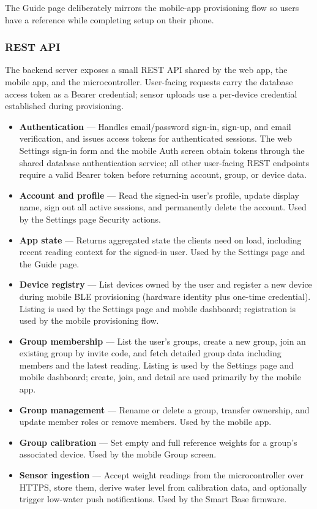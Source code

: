 \noindent The Guide page deliberately mirrors the mobile-app provisioning flow so users have a reference while completing setup on their phone.

\subsubsection{REST API}
The backend server exposes a small REST API shared by the web app, the mobile app, and the microcontroller. User-facing requests carry the database access token as a Bearer credential; sensor uploads use a per-device credential established during provisioning.

\begin{itemize}
    \item \textbf{Authentication} --- Handles email/password sign-in, sign-up, and email verification, and issues access tokens for authenticated sessions. The web Settings sign-in form and the mobile Auth screen obtain tokens through the shared database authentication service; all other user-facing REST endpoints require a valid Bearer token before returning account, group, or device data.
    \item \textbf{Account and profile} --- Read the signed-in user's profile, update display name, sign out all active sessions, and permanently delete the account. Used by the Settings page Security actions.
    \item \textbf{App state} --- Returns aggregated state the clients need on load, including recent reading context for the signed-in user. Used by the Settings page and the Guide page. 
    \item \textbf{Device registry} --- List devices owned by the user and register a new device during mobile BLE provisioning (hardware identity plus one-time credential). Listing is used by the Settings page and mobile dashboard; registration is used by the mobile provisioning flow.
    \item \textbf{Group membership} --- List the user's groups, create a new group, join an existing group by invite code, and fetch detailed group data including members and the latest reading. Listing is used by the Settings page and mobile dashboard; create, join, and detail are used primarily by the mobile app.
    \item \textbf{Group management} --- Rename or delete a group, transfer ownership, and update member roles or remove members. Used by the mobile app.
    \item \textbf{Group calibration} --- Set empty and full reference weights for a group's associated device. Used by the mobile Group screen.
    \item \textbf{Sensor ingestion} --- Accept weight readings from the microcontroller over HTTPS, store them, derive water level from calibration data, and optionally trigger low-water push notifications. Used by the Smart Base firmware.
\end{itemize}

